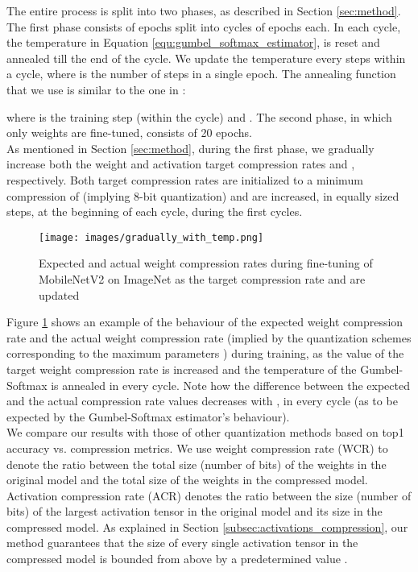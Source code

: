 \documentclass{article}
\begin{document}
The entire process is split into two phases, as described in Section \ref{sec:method}.
The first phase consists of  epochs split into  cycles of  epochs each. 
In each cycle, the temperature  in Equation \ref{equ:gumbel_softmax_estimator}, is reset and annealed till the end of the cycle.
We update the temperature every  steps within a cycle, where  is the number of steps in a single epoch.
The annealing function that we use is similar to the one in \cite{jang2016categorical}:

where  is the training step (within the cycle) and .
The second phase, in which only weights are fine-tuned, consists of 20 epochs.\\

As mentioned in Section \ref{sec:method}, during the first phase, we gradually increase both the weight and activation target compression rates  and , respectively.
Both target compression rates are initialized to a minimum compression of  (implying 8-bit quantization) and are increased, in equally sized steps, at the beginning of each cycle, during the first  cycles.
\begin{figure}
	\centering
	\texttt{[image: images/gradually\_with\_temp.png]}
	\caption{
		Expected and actual weight compression rates during fine-tuning of MobileNetV2 on ImageNet as the target compression rate and  are updated
	}
\label{fig:gradually_inc}
\end{figure}

Figure \ref{fig:gradually_inc} shows an example of the behaviour of the expected weight compression rate  and the actual weight compression rate (implied by the quantization schemes corresponding to the maximum parameters ) during training, as the value of the target weight compression rate  is increased and the temperature  of the Gumbel-Softmax is annealed in every cycle.
Note how the difference between the expected and the actual compression rate values decreases with , in every cycle (as to be expected by the Gumbel-Softmax estimator's behaviour).\\

We compare our results with those of other quantization methods based on top1 accuracy vs. compression metrics.
We use weight compression rate (WCR) to denote the ratio between the total size (number of bits) of the weights in the original model and the total size of the weights in the compressed model.
Activation compression rate (ACR) denotes the ratio between the size (number of bits) of the largest activation tensor in the original model and its size in the compressed model.
As explained in Section \ref{subsec:activations_compression}, our method guarantees that the size of every single activation tensor in the compressed model is bounded from above by a predetermined value .
\end{document}
